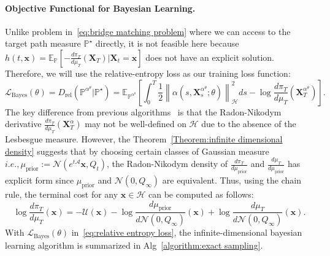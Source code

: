 \documentclass[nohyperref]{article}
\theoremstyle{plain}
\theoremstyle{remark}
\newcommand{\mc}{\mathcal}
\newcommand{\mb}{\mathbf}
\newcommand{\norm}[1]{\left\lVert#1\right\rVert}
\newcommand{\ie}{\textit{i}.\textit{e}., }
\begin{document}
\paragraph{Objective Functional for Bayesian Learning.} 
Unlike problem in~\eqref{eq:bridge matching problem} where we can access to the target path measure $\mathbb{P}^{\star}$ directly, it is not feasible here because $h(t, \mb{x}) = \mathbb{E}_{\mathbb{P}}\left[-\frac{d\pi_T}{d\mu_T}(\mb{X}_T) | \mb{X}_t=\mb{x}\right]$ does not have an explicit solution. Therefore, we will use the relative-entropy loss as our training loss function:
\begin{equation}\label{eq:relative entropy loss}
    \mc{L}_{\text{Bayes}}(\theta) = D_{\text{rel}}(\mathbb{P}^{\alpha^{\theta}}|\mathbb{P}^{\star}) = \mathbb{E}_{\mathbb{P}^{\alpha^{\theta}}}\left[ \int_0^T \frac{1}{2}\norm{\alpha(s, \mb{X}^{\alpha^{\theta}}_s; \theta)}_{\mc{H}}^2 ds - \log \frac{d\pi_T}{d\mu_T}(\mb{X}^{\alpha^{\theta}}_T) \right].
\end{equation}
The key difference from previous algorithms~\citep{zhang2022path, vargas2023bayesian} is that the Radon-Nikodym derivative $\frac{d\pi_T}{d\mu_T}(\mb{X}^{\alpha}_T)$ may not be well-defined on $\mc{H}$ due to the absence of the Lesbesgue measure. However, the Theorem~\ref{Theorem:infinite dimensional density} suggests that by choosing certain classes of Gaussian measure $\ie \mu_{\text{prior}} := \mc{N}(e^{t\mc{A}}\mb{x}, Q_t)$, the Radon-Nikodym density of $\frac{d\pi_T}{d\mu_{\text{prior}}}$ and $\frac{d\mu_T}{d\mu_{\text{prior}}}$ has explicit form since $\mu_{\text{prior}}$ and $\mc{N}(0, Q_{\infty})$ are equivalent.  Thus, using the chain rule, the terminal cost for any $\mb{x} \in \mc{H}$ can be computed as follows:
\begin{equation}
    \log \frac{d\pi_T}{d\mu_T}(\mb{x}) = -\mc{U}(\mb{x}) - \log \frac{d\mu_{\text{prior}}}{d\mc{N}(0, Q_{\infty})}(\mb{x}) + \log \frac{d\mu_T}{d\mc{N}(0, Q_{\infty})}(\mb{x}).
\end{equation}
With $\mc{L}_{\text{Bayes}}(\theta)$ in~\eqref{eq:relative entropy loss}, the infinite-dimensional bayesian learning algorithm is summarized in Alg~\ref{algorithm:exact sampling}.
\end{document}
